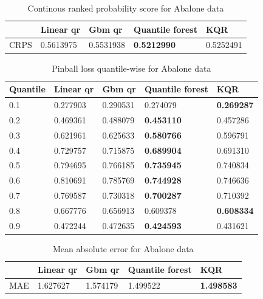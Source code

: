 \begin{table}
    \caption{Continous ranked probability score for Abalone data}
\begin{tabular}{lllll}
    \toprule
  & Linear qr & Gbm qr & Quantile forest & KQR \\
    \midrule
    CRPS & 0.5613975 & 0.5531938 & \textbf{0.5212990} & 0.5252491 \\
    \bottomrule
    \end{tabular}
\end{table}
    
\begin{table}
    \caption{Pinball loss quantile-wise for Abalone data}
    \begin{tabular}{lllll}
    \toprule
    Quantile & Linear qr & Gbm qr & Quantile forest & KQR \\
    \midrule
    0.1 & 0.277903 & 0.290531 & 0.274079 & \textbf{0.269287} \\
    0.2 & 0.469361 & 0.488079 & \textbf{0.453110} & 0.457286 \\
    0.3 & 0.621961 & 0.625633 & \textbf{0.580766} & 0.596791 \\
    0.4 & 0.729757 & 0.715875 & \textbf{0.689904} & 0.691310 \\
    0.5 & 0.794695 & 0.766185 & \textbf{0.735945} & 0.740834 \\
    0.6 & 0.810691 & 0.785769 & \textbf{0.744928} & 0.746636 \\
    0.7 & 0.769587 & 0.730318 & \textbf{0.700287} & 0.710392 \\
    0.8 & 0.667776 & 0.656913 & 0.609378 & \textbf{0.608334} \\
    0.9 & 0.472244 & 0.472635 & \textbf{0.424593} & 0.431621 \\
    \bottomrule
    \end{tabular}
\end{table}
    
\begin{table}
    \caption{Mean absolute error for Abalone data}
    \begin{tabular}{lllll}
    \toprule
     & Linear qr & Gbm qr & Quantile forest & KQR \\
    \midrule
    MAE & 1.627627 & 1.574179 & 1.499522 & \textbf{1.498583} \\
    \bottomrule
    \end{tabular}
\end{table} 

